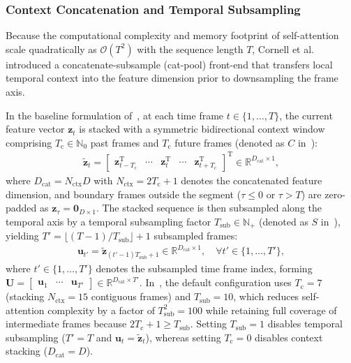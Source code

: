 \documentclass[lettersize,journal]{IEEEtran}
\begin{document}
\subsubsection{Context Concatenation and Temporal Subsampling}
\label{sec:causal_cat_pool}
Because the computational complexity and memory footprint of self-attention scale quadratically as $\mathcal{O}(T^2)$ with the sequence length $T$, Cornell et al.~\cite{cornell2022overlapped} introduced a concatenate-subsample (cat-pool) front-end that transfers local temporal context into the feature dimension prior to downsampling the frame axis.

In the baseline formulation of~\cite{cornell2022overlapped}, at each time frame $t \in \{1, \dots, T\}$, the current feature vector $\mathbf{z}_t$ is stacked with a symmetric bidirectional context window comprising $T_{\mathrm{c}} \in \mathbb{N}_0$ past frames and $T_{\mathrm{c}}$ future frames (denoted as $C$ in~\cite{cornell2022overlapped}):
\begin{align}
  \tilde{\mathbf{z}}_t = \begin{bmatrix} \mathbf{z}_{t - T_{\mathrm{c}}}^{\mathrm{T}} & \cdots & \mathbf{z}_{t}^{\mathrm{T}} & \cdots & \mathbf{z}_{t + T_{\mathrm{c}}}^{\mathrm{T}} \end{bmatrix}^{\mathrm{T}} \in \mathbb{R}^{D_{\mathrm{cat}} \times 1},
  \label{eq:causal_cat}
\end{align}
where $D_{\mathrm{cat}} = N_{\mathrm{ctx}} D$ with $N_{\mathrm{ctx}} = 2T_{\mathrm{c}} + 1$ denotes the concatenated feature dimension, and boundary frames outside the segment ($\tau \le 0$ or $\tau > T$) are zero-padded as $\mathbf{z}_{\tau} = \mathbf{0}_{D \times 1}$. The stacked sequence is then subsampled along the temporal axis by a temporal subsampling factor $T_{\mathrm{sub}} \in \mathbb{N}_+$ (denoted as $S$ in~\cite{cornell2022overlapped}), yielding $T' = \lfloor (T - 1) / T_{\mathrm{sub}} \rfloor + 1$ subsampled frames:
\begin{align}
  \mathbf{u}_{t'} = \tilde{\mathbf{z}}_{(t'-1)T_{\mathrm{sub}} + 1} \in \mathbb{R}^{D_{\mathrm{cat}} \times 1}, \quad \forall t' \in \{1, \dots, T'\},
  \label{eq:causal_pool}
\end{align}
where $t' \in \{1, \dots, T'\}$ denotes the subsampled time frame index, forming $\mathbf{U} = \begin{bmatrix} \mathbf{u}_1 & \cdots & \mathbf{u}_{T'} \end{bmatrix} \in \mathbb{R}^{D_{\mathrm{cat}} \times T'}$. In~\cite{cornell2022overlapped}, the default configuration uses $T_{\mathrm{c}} = 7$ (stacking $N_{\mathrm{ctx}} = 15$ contiguous frames) and $T_{\mathrm{sub}} = 10$, which reduces self-attention complexity by a factor of $T_{\mathrm{sub}}^2 = 100$ while retaining full coverage of intermediate frames because $2T_{\mathrm{c}} + 1 \ge T_{\mathrm{sub}}$. Setting $T_{\mathrm{sub}} = 1$ disables temporal subsampling ($T' = T$ and $\mathbf{u}_t = \tilde{\mathbf{z}}_t$), whereas setting $T_{\mathrm{c}} = 0$ disables context stacking ($D_{\mathrm{cat}} = D$).
\end{document}
